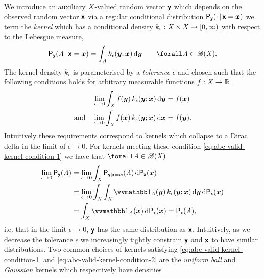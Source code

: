 We introduce an auxiliary $\mathit{X}$-valued random vector $\boldsymbol{\mathsf{y}}$ which depends on the observed random vector $\boldsymbol{\mathsf{x}}$ via a regular conditional distribution $\mathsf{P}_{\boldsymbol{\mathsf{y}}}(\cdot \operatorname{|} \boldsymbol{\mathsf{x}}=\boldsymbol{x})$ we term the \emph{kernel} which has a conditional density $k_\epsilon : \mathit{X} \times \mathit{X} \to [0, \infty)$ with respect to the Lebesgue measure,
\begin{equation}\label{eq:abc-kernel}
  \prob{\rvct{y}}\lpa \set{A} \gvn \rvct{x}=\vct{x} \rpa = 
  \int_{\set{A}} k_{\epsilon}(\vct{y}; \vct{x}) \,\dr\vct{y}
  \qquad \forall \set{A} \in \borel(\set{X}).
\end{equation}
The kernel density $k_\epsilon$ is parameterised by a \emph{tolerance} $\epsilon$ and chosen such that the following conditions holds for arbitrary measurable functions $f : \mathit{X} \to \mathbb{R}$
\begin{align}
  \label{eq:abc-valid-kernel-condition-1}
  \lim_{\epsilon \to 0} \int_{\mathit{X}} f(\boldsymbol{y}) \, k_{\epsilon}(\boldsymbol{y}; \boldsymbol{x}) \,\mathrm{d}\boldsymbol{y}
  &= f(\boldsymbol{x})\\
  \label{eq:abc-valid-kernel-condition-2}
  \textrm{and}\quad
  \lim_{\epsilon \to 0} \int_{\mathit{X}} f(\boldsymbol{x}) \, k_{\epsilon}(\boldsymbol{y}; \boldsymbol{x}) \,\mathrm{d}\boldsymbol{x}
  &= f(\boldsymbol{y}).
\end{align}
Intuitively these requirements correspond to kernels which collapse to a Dirac delta in the limit of $\epsilon \to 0$. For kernels meeting these condition \eqref{eq:abc-valid-kernel-condition-1} we have that $\forall \set{A} \in \borel(\set{X})$
\begin{align}
  \lim_{\epsilon \to 0 } \prob{\rvct{y}}(\set{A}) &=
  \lim_{\epsilon \to 0} 
  \int_{\set{X}}
    \prob{\rvct{y}|\rvct{x}=\vct{x}}\lpa \set{A} \rpa
  \,\dr\prob{\rvct{x}}(\vct{x})\\
  &=
  \lim_{\epsilon \to 0 } 
  \int_{\set{X}} \int_{\set{X}} 
    \ind{\set{A}}(\vct{y}) \, k_{\epsilon}(\vct{y}; \vct{x}) 
  \,\dr\vct{y} \,\dr\prob{\rvct{x}}(\vct{x})\\
  &=
  \int_{\set{X}} \ind{\set{A}}(\vct{x}) \,\dr\prob{\rvct{x}}(\vct{x}) =
  \prob{\rvct{x}}(\set{A}),
\end{align}
i.e. that in the limit $\epsilon \to 0$, $\boldsymbol{\mathsf{y}}$ has the same distribution as $\boldsymbol{\mathsf{x}}$. Intuitively, as we decrease the tolerance $\epsilon$ we increasingly tightly constrain $\boldsymbol{\mathsf{y}}$ and $\boldsymbol{\mathsf{x}}$ to have similar distributions. Two common choices of kernels satisfying \eqref{eq:abc-valid-kernel-condition-1} and \eqref{eq:abc-valid-kernel-condition-2} are the \emph{uniform ball} and \emph{Gaussian} kernels which respectively have densities
